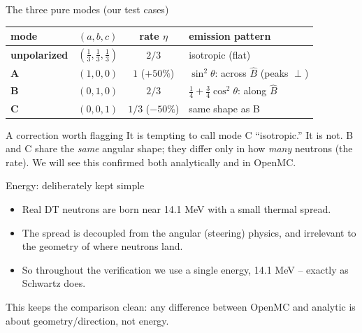 \documentclass[aspectratio=169]{beamer}
\newcommand{\Bhat}{\hat{B}}
\newcommand{\keyword}[1]{\textcolor{blue!60!black}{\textbf{#1}}}
\begin{document}
\begin{frame}{The three pure modes (our test cases)}
  \begin{center}\small
  \begin{tabular}{lccl}
    \toprule
    mode & $(a,b,c)$ & rate $\eta$ & emission pattern \\
    \midrule
    \keyword{unpolarized} & $(\tfrac13,\tfrac13,\tfrac13)$ & $2/3$ & \alert{isotropic} (flat) \\
    \keyword{A} & $(1,0,0)$ & $1$ ($+50\%$) & $\sin^2\theta$: \alert{across} $\Bhat$ (peaks $\perp$) \\
    \keyword{B} & $(0,1,0)$ & $2/3$ & $\tfrac14+\tfrac34\cos^2\theta$: \alert{along} $\Bhat$ \\
    \keyword{C} & $(0,0,1)$ & $1/3$ ($-50\%$) & \alert{same shape as B} \\
    \bottomrule
  \end{tabular}
  \end{center}
  \vfill
  \begin{block}{A correction worth flagging}
    It is tempting to call mode C ``isotropic.'' \alert{It is not.} B and C share the \emph{same} angular shape; they differ only in how \emph{many} neutrons (the rate). We will see this confirmed both analytically and in OpenMC.
  \end{block}
\end{frame}

\begin{frame}{Energy: deliberately kept simple}
  \begin{itemize}
    \item Real DT neutrons are born near 14.1 MeV with a small thermal spread.
    \item The spread is \alert{decoupled} from the angular (steering) physics, and irrelevant to the geometry of where neutrons land.
    \item So throughout the verification we use a single energy, \alert{14.1 MeV} -- exactly as Schwartz does.
  \end{itemize}
  \vfill
  \footnotesize This keeps the comparison clean: any difference between OpenMC and analytic is about \alert{geometry/direction}, not energy.
\end{frame}

\end{document}
